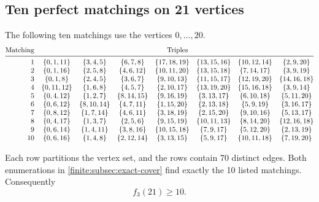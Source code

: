 \documentclass[10pt]{article}
\numberwithin{equation}{section}
\begin{document}
\subsection{Ten perfect matchings on 21 vertices}\label{finite:subsec:twentyone}
The following ten matchings use the vertices $0,\ldots,20$.
\[
\begin{array}{@{}r@{\quad}*{7}{c}@{}}
 \text{Matching}&\multicolumn{7}{c}{\text{Triples}}\\
 \midrule
 1 & \{0,1,11\} & \{3,4,5\} & \{6,7,8\} & \{17,18,19\} & \{13,15,16\} & \{10,12,14\} & \{2,9,20\}\\
 2 & \{0,1,16\} & \{2,5,8\} & \{4,6,12\} & \{10,11,20\} & \{13,15,18\} & \{7,14,17\} & \{3,9,19\}\\
 3 & \{0,1,8\} & \{2,4,5\} & \{3,6,7\} & \{9,10,13\} & \{11,15,17\} & \{12,19,20\} & \{14,16,18\}\\
 4 & \{0,11,12\} & \{1,6,8\} & \{4,5,7\} & \{2,10,17\} & \{13,19,20\} & \{15,16,18\} & \{3,9,14\}\\
 5 & \{0,4,12\} & \{1,2,7\} & \{8,14,15\} & \{9,16,19\} & \{3,13,17\} & \{6,10,18\} & \{5,11,20\}\\
 6 & \{0,6,12\} & \{8,10,14\} & \{4,7,11\} & \{1,15,20\} & \{2,13,18\} & \{5,9,19\} & \{3,16,17\}\\
 7 & \{0,8,12\} & \{1,7,14\} & \{4,6,11\} & \{3,18,19\} & \{2,15,20\} & \{9,10,16\} & \{5,13,17\}\\
 8 & \{0,4,17\} & \{1,3,7\} & \{2,5,6\} & \{9,15,19\} & \{10,11,13\} & \{8,14,20\} & \{12,16,18\}\\
 9 & \{0,6,14\} & \{1,4,11\} & \{3,8,16\} & \{10,15,18\} & \{7,9,17\} & \{5,12,20\} & \{2,13,19\}\\
 10 & \{0,6,16\} & \{1,4,8\} & \{2,12,14\} & \{3,13,15\} & \{5,9,17\} & \{10,11,18\} & \{7,19,20\}
\end{array}
\]

Each row partitions the vertex set, and the rows contain 70 distinct edges. Both enumerations in \cref{finite:subsec:exact-cover} find exactly the 10 listed matchings. Consequently
\begin{equation}\label{finite:eq:ten21}
 f_3(21)\ge10.
\end{equation}
\end{document}
